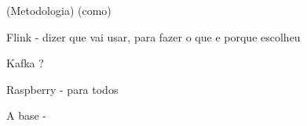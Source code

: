 (Metodologia) (como)

Flink  - dizer que vai usar, para fazer o que e porque escolheu 

Kafka ?

Raspberry - para todos

A base - 

